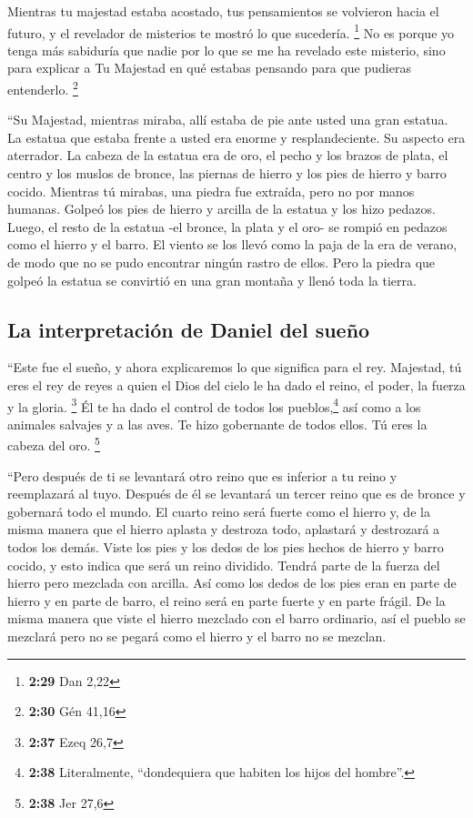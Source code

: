  Mientras tu majestad estaba acostado, tus pensamientos
se volvieron hacia el futuro, y el revelador de misterios te mostró lo
que sucedería. \footnote{\textbf{2:29} Dan 2,22}  No es
porque yo tenga más sabiduría que nadie por lo que se me ha revelado
este misterio, sino para explicar a Tu Majestad en qué estabas pensando
para que pudieras entenderlo. \footnote{\textbf{2:30} Gén 41,16}

 ``Su Majestad, mientras miraba, allí estaba de pie ante
usted una gran estatua. La estatua que estaba frente a usted era enorme
y resplandeciente. Su aspecto era aterrador.  La cabeza
de la estatua era de oro, el pecho y los brazos de plata, el centro y
los muslos de bronce,  las piernas de hierro y los pies
de hierro y barro cocido.  Mientras tú mirabas, una
piedra fue extraída, pero no por manos humanas. Golpeó los pies de
hierro y arcilla de la estatua y los hizo pedazos. 
Luego, el resto de la estatua -el bronce, la plata y el oro- se rompió
en pedazos como el hierro y el barro. El viento se los llevó como la
paja de la era de verano, de modo que no se pudo encontrar ningún rastro
de ellos. Pero la piedra que golpeó la estatua se convirtió en una gran
montaña y llenó toda la tierra.

\hypertarget{la-interpretaciuxf3n-de-daniel-del-sueuxf1o}{%
\subsection{La interpretación de Daniel del
sueño}\label{la-interpretaciuxf3n-de-daniel-del-sueuxf1o}}

 ``Este fue el sueño, y ahora explicaremos lo que
significa para el rey.  Majestad, tú eres el rey de reyes
a quien el Dios del cielo le ha dado el reino, el poder, la fuerza y la
gloria. \footnote{\textbf{2:37} Ezeq 26,7}  Él te ha dado
el control de todos los pueblos,\footnote{\textbf{2:38} Literalmente,
  ``dondequiera que habiten los hijos del hombre''.} así como a los
animales salvajes y a las aves. Te hizo gobernante de todos ellos. Tú
eres la cabeza del oro. \footnote{\textbf{2:38} Jer 27,6}

 ``Pero después de ti se levantará otro reino que es
inferior a tu reino y reemplazará al tuyo. Después de él se levantará un
tercer reino que es de bronce y gobernará todo el mundo. 
El cuarto reino será fuerte como el hierro y, de la misma manera que el
hierro aplasta y destroza todo, aplastará y destrozará a todos los
demás.  Viste los pies y los dedos de los pies hechos de
hierro y barro cocido, y esto indica que será un reino dividido. Tendrá
parte de la fuerza del hierro pero mezclada con arcilla. 
Así como los dedos de los pies eran en parte de hierro y en parte de
barro, el reino será en parte fuerte y en parte frágil. 
De la misma manera que viste el hierro mezclado con el barro ordinario,
así el pueblo se mezclará pero no se pegará como el hierro y el barro no
se mezclan.

